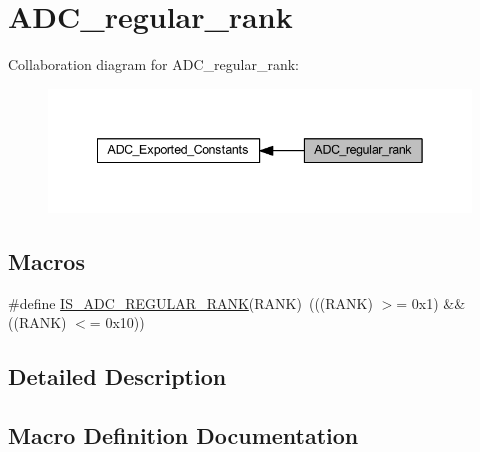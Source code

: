 \hypertarget{group___a_d_c__regular__rank}{}\section{A\+D\+C\+\_\+regular\+\_\+rank}
\label{group___a_d_c__regular__rank}
Collaboration diagram for A\+D\+C\+\_\+regular\+\_\+rank\+:
\nopagebreak
\begin{figure}[H]
\begin{center}
\leavevmode
\includegraphics[width=342pt]{group___a_d_c__regular__rank}
\end{center}
\end{figure}
\subsection*{Macros}
\begin{DoxyCompactItemize}
\item 
\#define \hyperlink{group___a_d_c__regular__rank_ga5928a1e9315f798e27220b91f1bae7f2}{I\+S\+\_\+\+A\+D\+C\+\_\+\+R\+E\+G\+U\+L\+A\+R\+\_\+\+R\+A\+NK}(R\+A\+NK)~(((R\+A\+NK) $>$= 0x1) \&\& ((\+R\+A\+N\+K) $<$= 0x10))
\end{DoxyCompactItemize}


\subsection{Detailed Description}


\subsection{Macro Definition Documentation}
\mbox{\label{group___a_d_c__regular__rank_ga5928a1e9315f798e27220b91f1bae7f2}} 

